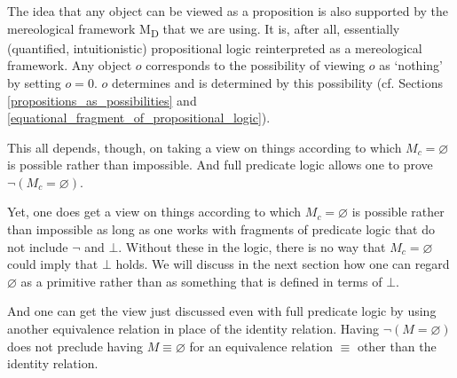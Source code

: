 \documentclass[12pt]{book}
\begin{document}
The idea that any object can be viewed as a proposition is also supported by the mereological framework M\textsubscript{D} that we are using. It is, after all, essentially (quantified, intuitionistic) propositional logic reinterpreted as a mereological framework. Any object $o$ corresponds to the possibility of viewing $o$ as `nothing' by setting $o = 0$. $o$ determines and is determined by this possibility (cf. Sections \ref{propositions_as_possibilities} and \ref{equational_fragment_of_propositional_logic}).

This all depends, though, on taking a view on things according to which $M_c = \varnothing$ is possible rather than impossible. And full predicate logic allows one to prove $\neg (M_c = \varnothing)$.

Yet, one does get a view on things according to which $M_c = \varnothing$ is possible rather than impossible as long as one works with fragments of predicate logic that do not include $\neg$ and $\bot$. Without these in the logic, there is no way that $M_c = \varnothing$ could imply that $\bot$ holds. We will discuss in the next section how one can regard $\varnothing$ as a primitive rather than as something that is defined in terms of $\bot$.

And one can get the view just discussed even with full predicate logic by using another equivalence relation in place of the identity relation. Having $\neg (M = \varnothing)$ does not preclude having $M \equiv \varnothing$ for an equivalence relation $\equiv$ other than the identity relation. 

\end{document}
